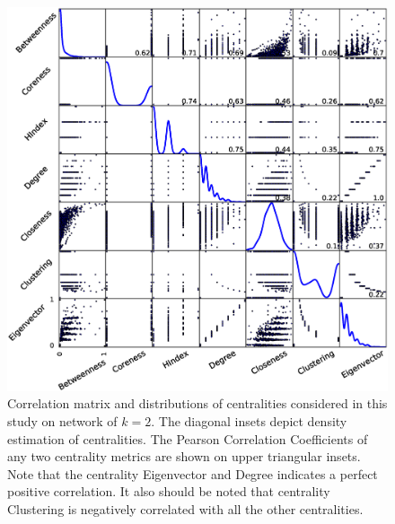 \documentclass[preprint,12pt,3p]{elsarticle}
\begin{document}
\begin{figure}
  \centering
  \includegraphics[width=16cm]{Powerlaw_k2_centrality_correlation.eps}
  \caption{Correlation matrix and distributions of centralities considered in this study on network of $k=2$.
  The diagonal insets depict density estimation of centralities.
  The Pearson Correlation Coefficients of any two centrality metrics are shown on upper triangular insets.
  Note that the centrality Eigenvector and Degree indicates a perfect positive correlation.
  It also should be noted that centrality Clustering is negatively correlated with all the other centralities.
    }
  \label{fig corr centrality k=2}
\end{figure}
\end{document}
